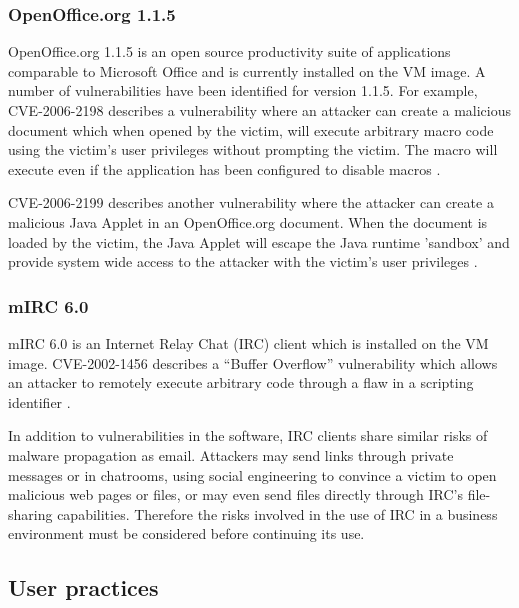 \subsubsection{OpenOffice.org 1.1.5}

OpenOffice.org 1.1.5 is an open source productivity suite of applications comparable to Microsoft Office and is currently installed on the VM image. A number of vulnerabilities have been identified for version 1.1.5. For example, CVE-2006-2198 describes a vulnerability where an attacker can create a malicious document which when opened by the victim, will execute arbitrary macro code using the victim's user privileges without prompting the victim. The macro will execute even if the application has been configured to disable macros \citep{MITRE2006a}.

CVE-2006-2199 describes another vulnerability where the attacker can create a malicious Java Applet in an OpenOffice.org document. When the document is loaded by the victim, the Java Applet will escape the Java runtime 'sandbox' and provide system wide access to the attacker with the victim's user privileges \citep{MITRE2006b, SecurityTracker2006}.


\subsubsection{mIRC 6.0}

mIRC 6.0 is an Internet Relay Chat (IRC) client which is installed on the VM image. CVE-2002-1456 describes a ``Buffer Overflow'' vulnerability which allows an attacker to remotely execute arbitrary code through a flaw in a scripting identifier \citep{MITRE2003, Martin2002}.

In addition to vulnerabilities in the software, IRC clients share similar risks of malware propagation as email. Attackers may send links through private messages or in chatrooms, using social engineering to convince a victim to open malicious web pages or files, or may even send files directly through IRC's file-sharing capabilities. Therefore the risks involved in the use of IRC in a business environment must be considered before continuing its use.

\subsection{User practices}

